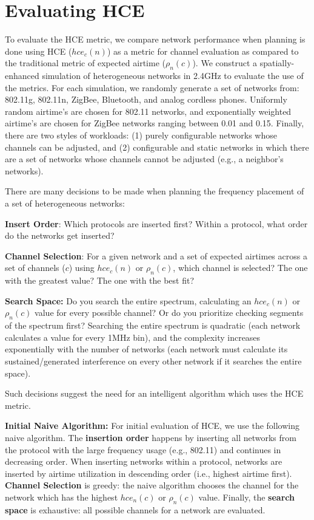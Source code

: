 \section{Evaluating HCE}

To evaluate the HCE metric, we compare network performance when planning is done using HCE ($hce_c(n)$) as a metric for channel evaluation as compared to the traditional metric of expected airtime ($\rho_n(c)$).   We construct a spatially-enhanced simulation of heterogeneous networks in 2.4GHz to evaluate the use of the metrics.  For each simulation, we randomly generate a set of networks from: 802.11g, 802.11n, ZigBee, Bluetooth, and analog cordless phones.  Uniformly random airtime's are chosen for 802.11 networks, and exponentially weighted airtime's are chosen for ZigBee networks ranging between 0.01 and 0.15.  Finally, there are two styles of workloads: (1) purely configurable networks whose channels can be adjusted, and (2) configurable and static networks in which there are a set of networks whose channels cannot be adjusted (e.g., a neighbor's networks). 

There are many decisions to be made when planning the frequency placement of a set of heterogeneous networks:

\squishlist

	\item \textbf{Insert Order}:   Which protocols are inserted first?  Within a protocol, what order do the networks get inserted?
	
	\item \textbf{Channel Selection}:  For a given network and a set of expected airtimes across a set of channels ($c$) using $hce_c(n)$ or $\rho_n(c)$, which channel is selected?  The one with the greatest value?  The one with the best fit?
	
	\item \textbf{Search Space:}  Do you search the entire spectrum, calculating an $hce_c(n)$ or $\rho_n(c)$ value for every possible channel?  Or do you prioritize checking segments of the spectrum first?  Searching the entire spectrum is quadratic (each network calculates a value for every 1MHz bin), and the complexity increases exponentially with the number of networks (each network must calculate its sustained/generated interference on every other network if it searches the entire space).  

\squishend

Such decisions suggest the need for an intelligent algorithm which uses the HCE metric. 

\textbf{Initial Naive Algorithm:}  For initial evaluation of HCE, we use the following naive algorithm.  The \textbf{insertion order} happens by inserting all networks from the protocol with the large frequency usage (e.g., 802.11) and continues in decreasing order.  When inserting networks within a protocol, networks are inserted by airtime utilization in descending order (i.e., highest airtime first).    \textbf{Channel Selection} is greedy: the naive algorithm chooses the channel for the network which has the highest $hce_n(c)$ or $\rho_n(c)$ value.  Finally, the \textbf{search space} is exhaustive:  all possible channels for a network are evaluated.  